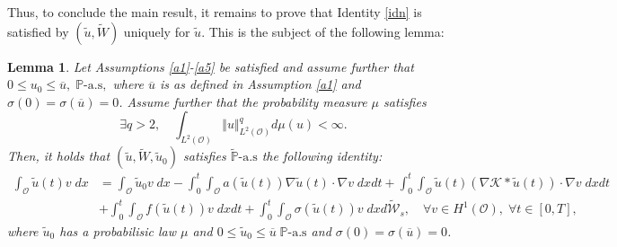 \documentclass[10pt,number,preprint,times]{elsarticle}
\numberwithin{equation}{section} %
\newtheorem{lem}{Lemma}[section]
\begin{document}
\noindent
Thus, to conclude the main result, it remains to prove that Identity \eqref{idn} is satisfied by $\left(\tilde{u},\tilde{W}\right)$ uniquely for $\tilde{u}$. This is the subject of the following lemma:
\begin{lem}
	Let Assumptions \ref{a1}-\ref{a5} be satisfied and assume further that $0 \leq u_0 \leq \overline{u},\; \mathbb{P}\text{-a.s},$ where $\overline{u}$ is as defined in Assumption \ref{a1} and $\sigma(0)=\sigma(\overline{u})=0$. Assume further that the probability measure $\mu$ satisfies 
\begin{equation}\label{condinit}
\exists q>2, \quad \int_{L^2(\mathcal{O})} \Vert u \Vert_{L^2(\mathcal{O})}^q d\mu(u)< \infty.
\end{equation}
 Then, it holds that $\left(\tilde{u},\tilde{W},\tilde{u}_0\right)$ satisfies $\tilde{\mathbb{P}}\text{-a.s}$  the following identity: 
\begin{equation}\label{idntild}
	\begin{split}
		\int_\mathcal{O} \tilde{u}(t)v\; dx&= \int_\mathcal{O} \tilde{u}_0v\; dx- \int_{0}^t \int_{\mathcal{O}} a(\tilde{u}(t))\nabla \tilde{u}(t) \cdot \nabla v\; dxdt+\int_{0}^t \int_{\mathcal{O}} \tilde{u}(t)\left(\nabla \mathcal{K} \ast \tilde{u}(t)\right) \cdot \nabla v\; dxdt\\
		&+\int_{0}^t \int_{\mathcal{O}} f(\tilde{u}(t))v\; dxdt+\int_{0}^t \int_{\mathcal{O}} \sigma(\tilde{u}(t))v\; dx d\tilde{\mathcal{W}}_s, \quad \forall v \in H^1(\mathcal{O}), \; \forall t \in [0,T],
	\end{split}
\end{equation}
where $\tilde{u}_0$ has a probabilisic law $\mu$ and $0 \leq \tilde{u}_0 \leq \overline{u}\; \mathbb{P}\text{-a.s}$ and $\sigma(0)=\sigma(\overline{u})=0$.
\end{lem}
\end{document}
